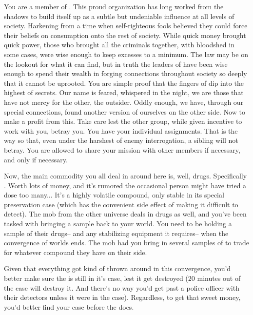 \documentclass[blue]{guildcamp3}
\begin{document}
\name{\bTechMob{}}


You are a member of \bTechMob{}. This proud organization has long worked from the shadows to build itself up as a subtle but undeniable influence at all levels of \bTechWorld{} society. Harkening from a time when self-righteous fools believed they could force their beliefs on consumption onto the rest of society. While quick money brought quick power, those who brought all the criminals together, with bloodshed in some cases, were wise enough to keep excesses to a minimum. The law may be on the lookout for what it can find, but in truth the leaders of \bTechMob{} have been wise enough to spend their wealth in forging connections throughout society so deeply that it cannot be uprooted. You are simple proof that the fingers of \bTechMob{} dip into the highest of secrets. Our name is feared, whispered in the night, we are those that have not mercy for the other, the outsider. Oddly enough, we have, through our special connections, found another version of ourselves on the other side. Now to make a profit from this. Take care lest the other group, while given incentive to work with you, betray you. You have your individual assignments. That is the way so that, even under the harshest of enemy interrogation, a sibling will not betray. You are allowed to share your mission with other members if necessary, and only if necessary.

Now, the main commodity you all deal in around here is, well, drugs. Specifically \iDrugsTech{}. Worth lots of money, and it's rumored the occasional person might have tried a dose too many... It's a highly volatile compound, only stable in its special preservation case (which has the convenient side effect of making it difficult to detect). The mob from the other universe deals in drugs as well, and you've been tasked with bringing a sample back to your world. You need to be holding a sample of their drugs-- and any stabilizing equipment it requires-- when the convergence of worlds ends. The mob had you bring in several samples of \iDrugsTech{} to trade for whatever compound they have on their side.

Given that everything got kind of thrown around in this convergence, you'd better make sure the \iDrugsTech{} is still in it's case, lest it get destroyed (20 minutes out of the case will destroy it. And there's no way you'd get past a police officer with their detectors unless it were in the case). Regardless, to get that sweet money, you'd better find your case before the \bMagicMob{} does. 
\end{document}
